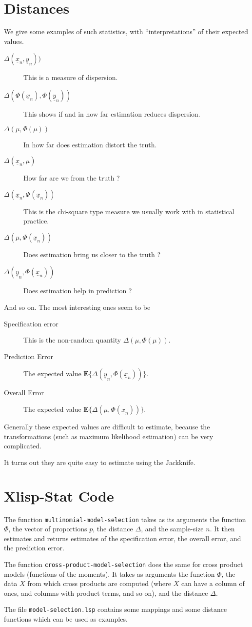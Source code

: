 \documentclass[12pt]{amsart}
\begin{document}
\section{Distances}
%
We give some examples of such statistics, with ``interpretations''
of their expected values.
\begin{description}
\item[$\Delta(\underline{x}_n,\underline{y}_n))$]
This is a measure of dispersion.
\item[$\Delta(\Phi(\underline{x}_n),\Phi(\underline{y}_n))$]
This shows if and in how far estimation reduces dispersion.
\item[$\Delta(\mu,\Phi(\mu))$]
In how far does estimation distort the truth.
\item[$\Delta(\underline{x}_n,\mu)$]
How far are we from the truth ?
\item[$\Delta(\underline{x}_n,\Phi(\underline{x}_n))$]
This is the chi-square type measure we usually work with
in statistical practice.
\item[$\Delta(\mu,\Phi(\underline{x}_n))$]
Does estimation bring us closer to the truth ?
\item[$\Delta(\underline{y}_n,\Phi(\underline{x}_n))$]
Does estimation help in prediction ?
\end{description}
%
And so on. The most interesting ones seem to be
\begin{description}
\item[Specification error]
This is the non-random quantity $\Delta(\mu,\Phi(\mu))$.
\item[Prediction Error]
The expected value $\mathbf{E}\{\Delta(\underline{y}_n,
\Phi(\underline{x}_n))\}$.
\item[Overall Error]
The expected value $\mathbf{E}\{\Delta(\mu,\Phi(\underline{x}_n))\}$.
\end{description}
Generally these expected values are difficult to estimate, because the
transformations (such as maximum likelihood estimation) can be
very complicated.\par
%
It turns out they are quite easy to estimate using the Jackknife.
%
\section{Xlisp-Stat Code}
%
The function \texttt{multinomial-model-selection} takes as its
arguments the function $\Phi$, the vector of proportions $p$,
the distance $\Delta$, and the sample-size $n$. It then estimates
and returns estimates of the specification error, the overall
error, and the prediction error.\par
The function \texttt{cross-product-model-selection} does the
same for cross product models (functions of the moments). It 
takes as arguments the function $\Phi$,
the data $X$ from which cross products are
computed (where $X$ can have a column of ones, and columns 
with product terms, and so on), and the distance $\Delta$.\par
%
The file \texttt{model-selection.lsp} contains some mappings
and some distance functions which can be used as examples.
\end{document}
